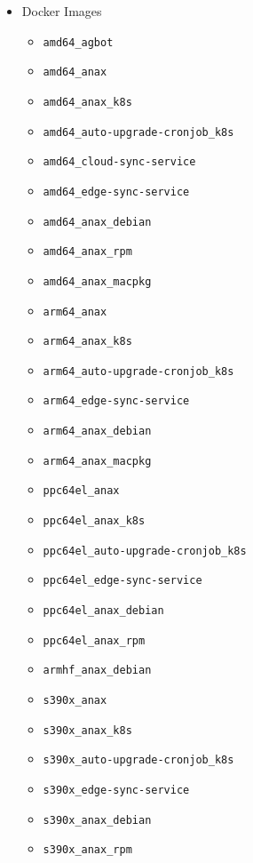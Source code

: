 \documentclass[a4paper,11pt]{article}
\begin{document}
\begin{itemize}
    \item Docker Images
    \begin{itemize}
        \item\verb|amd64_agbot|
        \item\verb|amd64_anax|
        \item\verb|amd64_anax_k8s|
        \item\verb|amd64_auto-upgrade-cronjob_k8s|
        \item\verb|amd64_cloud-sync-service|
        \item\verb|amd64_edge-sync-service|
        \item\verb|amd64_anax_debian|
        \item\verb|amd64_anax_rpm|
        \item\verb|amd64_anax_macpkg|
        \\
        \item\verb|arm64_anax|
        \item\verb|arm64_anax_k8s|
        \item\verb|arm64_auto-upgrade-cronjob_k8s|
        \item\verb|arm64_edge-sync-service|
        \item\verb|arm64_anax_debian|
        \item\verb|arm64_anax_macpkg|
        \\
        \item\verb|ppc64el_anax|
        \item\verb|ppc64el_anax_k8s|
        \item\verb|ppc64el_auto-upgrade-cronjob_k8s|
        \item\verb|ppc64el_edge-sync-service|
        \item\verb|ppc64el_anax_debian|
        \item\verb|ppc64el_anax_rpm|
        \\
        \item\verb|armhf_anax_debian|
        \\
        \item\verb|s390x_anax|
        \item\verb|s390x_anax_k8s|
        \item\verb|s390x_auto-upgrade-cronjob_k8s|
        \item\verb|s390x_edge-sync-service|
        \item\verb|s390x_anax_debian|
        \item\verb|s390x_anax_rpm|

\end{itemize}
\end{itemize}
\end{document}
